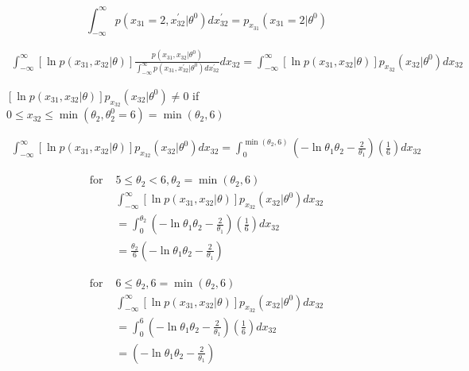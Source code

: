 \documentclass{article}
\begin{document}
\begin{equation}
\int_{-\infty}^{\infty} p(x_{31}=2, x_{32}^{'} |\theta^{0}) dx_{32}^{'} = p_{x_{31}}(x_{31}=2|\theta^{0})  
\end{equation}

\begin{equation}
\begin{aligned}
 \int_{-\infty}^{\infty} [ \ln{p(x_{31},x_{32} | \theta)}] \frac{p(x_{31},x_{32}|\theta^{0})}{\int_{-\infty}^{\infty} p(x_{31}, x_{32}^{'} |\theta^{0}) dx_{32}^{'} } dx_{32} = \int_{-\infty}^{\infty} [ \ln{p(x_{31},x_{32} | \theta)}] p_{x_{32}}(x_{32}|\theta^{0}) dx_{32}
\end{aligned}
\end{equation}

$[ \ln{p(x_{31},x_{32} | \theta)}] p_{x_{32}}(x_{32}|\theta^{0}) \neq 0$ if $ 0 \leq x_{32} \leq \min(\theta_2,  \theta_{2}^{0}=6) = \min(\theta_2,  6) $

\begin{equation}
\begin{aligned}
 \int_{-\infty}^{\infty} [ \ln{p(x_{31},x_{32} | \theta)}] p_{x_{32}}(x_{32}|\theta^{0}) dx_{32} = \int_{0}^{\min(\theta_2,  6)} ( -\ln{\theta_1 \theta_2} -\frac{2}{\theta_1}) (\frac{1}{6}) dx_{32}
\end{aligned}
\end{equation}

\begin{equation}
\begin{aligned}
 \mbox{for }   & 5 \leq \theta_2 <6, \theta_2=\min(\theta_2,  6) \\
& \int_{-\infty}^{\infty} [ \ln{p(x_{31},x_{32} | \theta)}] p_{x_{32}}(x_{32}|\theta^{0}) dx_{32} \\
& = \int_{0}^{\theta_2} ( -\ln{\theta_1 \theta_2} -\frac{2}{\theta_1}) (\frac{1}{6}) dx_{32} \\
& = \frac{\theta_2}{6}(-\ln{\theta_1 \theta_2} -\frac{2}{\theta_1})
\end{aligned}
\end{equation}

\begin{equation}
\begin{aligned}
 \mbox{for }   & 6 \leq \theta_2 , 6=\min(\theta_2,  6) \\
& \int_{-\infty}^{\infty} [ \ln{p(x_{31},x_{32} | \theta)}] p_{x_{32}}(x_{32}|\theta^{0}) dx_{32} \\
& = \int_{0}^{6} ( -\ln{\theta_1 \theta_2} -\frac{2}{\theta_1}) (\frac{1}{6}) dx_{32} \\
& = (-\ln{\theta_1 \theta_2} -\frac{2}{\theta_1})
\end{aligned}
\end{equation}
\end{document}
